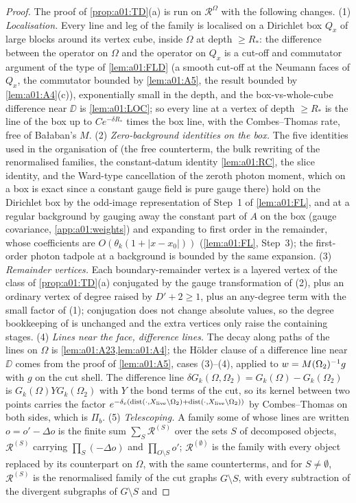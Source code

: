 \begin{proof}
The proof of \cref{prop:a01:TD}(a) is run on $\mathcal R^\Omega$ with the following changes. (1) \emph{Localisation.} Every line and leg of the family is localised on a Dirichlet box $Q_x$ of large blocks around its vertex cube, inside $\Omega$ at depth $\ge R_*$: the difference between the operator on $\Omega$ and the operator on $Q_x$ is a cut-off and commutator argument of the type of \cref{lem:a01:FLD} (a smooth cut-off at the Neumann faces of $Q_x$, the commutator bounded by \cref{lem:a01:A5}, the result bounded by \cref{lem:a01:A4}(c)), exponentially small in the depth, and the box-vs-whole-cube difference near $\DD$ is \cref{lem:a01:LOC}; so every line at a vertex of depth $\ge R_*$ is the line of the box up to $Ce^{-\delta R_*}$ times the box line, with the Combes--Thomas rate, free of Ba{\l}aban's $M$. (2) \emph{Zero-background identities on the box.} The five identities used in the organisation of \cite[p.~330]{K2} (the free counterterm, the bulk rewriting of the renormalised families, the constant-datum identity \cref{lem:a01:RC}, the slice identity, and the Ward-type cancellation of the zeroth photon moment, which on a box is exact since a constant gauge field is pure gauge there) hold on the Dirichlet box by the odd-image representation of Step~1 of \cref{lem:a01:FL}, and at a regular background by gauging away the constant part of $A$ on the box (gauge covariance, \cref{app:a01:weights}) and expanding to first order in the remainder, whose coefficients are $O(\theta_k(1+|x-x_0|))$ (\cref{lem:a01:FL}, Step~3); the first-order photon tadpole at a background is bounded by the same expansion. (3) \emph{Remainder vertices.} Each boundary-remainder vertex is a layered vertex of the class of \cref{prop:a01:TD}(a) conjugated by the gauge transformation of (2), plus an ordinary vertex of degree raised by $D'+2\ge1$, plus an any-degree term with the small factor of (1); conjugation does not change absolute values, so the degree bookkeeping of \cite[Sect.~2]{Ba3} is unchanged and the extra vertices only raise the containing stages. (4) \emph{Lines near the face, difference lines.} The decay along paths of the lines on $\Omega$ is \cref{lem:a01:A23,lem:a01:A4}; the H\"older clause of a difference line near $\DD$ comes from the proof of \cref{lem:a01:A5}, cases (3)--(4), applied to $w=M(\Omega_2)^{-1}g$ with $g$ on the cut shell. The difference line $\delta G_k(\Omega,\Omega_2)=G_k(\Omega)-G_k(\Omega_2)$ is $G_k(\Omega)Y G_k(\Omega_2)$ with $Y$ the bond terms of the cut, so its kernel between two points carries the factor $e^{-\delta_c(\operatorname{dist}(\cdot,X_{\mathrm{live}}\setminus\Omega_2)+\operatorname{dist}(\cdot,X_{\mathrm{live}}\setminus\Omega_2))}$ by Combes--Thomas on both sides, which is $\Pi_b$. (5) \emph{Telescoping.} A family some of whose lines are written $o=o'-\Delta o$ is the finite sum $\sum_S\mathcal R^{(S)}$ over the sets $S$ of decomposed objects, $\mathcal R^{(S)}$ carrying $\prod_S(-\Delta o)$ and $\prod_{O\setminus S}o'$; $\mathcal R^{(\emptyset)}$ is the family with every object replaced by its counterpart on $\Omega$, with the same counterterms, and for $S\ne\emptyset$, $\mathcal R^{(S)}$ is the renormalised family of the cut graphs $G\setminus S$, with every subtraction of the divergent subgraphs of $G\setminus S$ and 
\end{proof}
